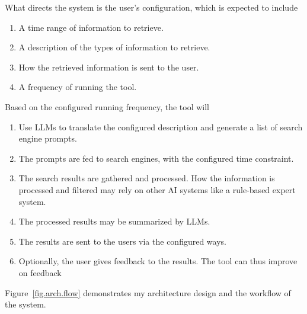 \documentclass[project-plan]{report-template}
\begin{document}
What directs the system is the user's configuration, which is expected to
include
\begin{enumerate}
	\item A time range of information to retrieve.
	\item A description of the types of information to
		retrieve.
	\item How the retrieved information is sent to the user.
	\item A frequency of running the tool.
\end{enumerate}

Based on the configured running frequency, the tool will
\begin{enumerate}
	\item Use LLMs to translate the configured description and generate a list
		of search engine prompts.
	\item The prompts are fed to search engines, with the configured time
		constraint.
	\item The search results are gathered and processed. How the information is
		processed and filtered may rely on other AI systems like a
		rule-based expert system.
	\item The processed results may be summarized by LLMs.
	\item The results are sent to the users via the configured ways.
	\item Optionally, the user gives feedback to the results. The tool can
		thus improve on feedback
\end{enumerate}

Figure~\ref{fig.arch.flow} demonstrates my architecture design and the workflow
of the system.
\end{document}
